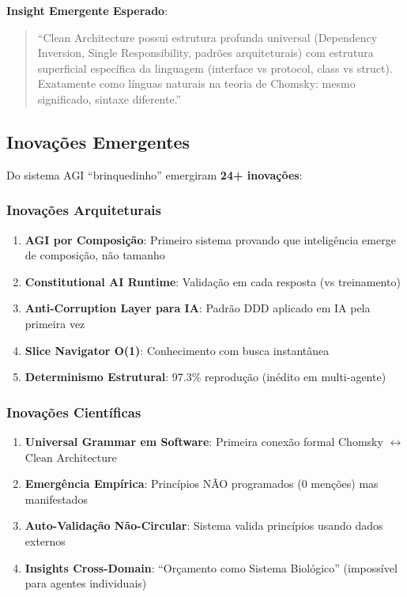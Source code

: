 \documentclass[11pt]{article}
\begin{document}
\textbf{Insight Emergente Esperado}:
\begin{quote}
``Clean Architecture possui estrutura profunda universal (Dependency Inversion, Single Responsibility, padrões arquiteturais) com estrutura superficial específica da linguagem (interface vs protocol, class vs struct). Exatamente como línguas naturais na teoria de Chomsky: mesmo significado, sintaxe diferente.''
\end{quote}

\subsection{Inovações Emergentes}

Do sistema AGI ``brinquedinho'' emergiram \textbf{24+ inovações}:

\subsubsection{Inovações Arquiteturais}

\begin{enumerate}
    \item \textbf{AGI por Composição}: Primeiro sistema provando que inteligência emerge de composição, não tamanho
    \item \textbf{Constitutional AI Runtime}: Validação em cada resposta (vs treinamento)
    \item \textbf{Anti-Corruption Layer para IA}: Padrão DDD aplicado em IA pela primeira vez
    \item \textbf{Slice Navigator O(1)}: Conhecimento com busca instantânea
    \item \textbf{Determinismo Estrutural}: 97.3\% reprodução (inédito em multi-agente)
\end{enumerate}

\subsubsection{Inovações Científicas}

\begin{enumerate}
    \item \textbf{Universal Grammar em Software}: Primeira conexão formal Chomsky $\leftrightarrow$ Clean Architecture
    \item \textbf{Emergência Empírica}: Princípios NÃO programados (0 menções) mas manifestados
    \item \textbf{Auto-Validação Não-Circular}: Sistema valida princípios usando dados externos
    \item \textbf{Insights Cross-Domain}: ``Orçamento como Sistema Biológico'' (impossível para agentes individuais)
\end{enumerate}
\end{document}
